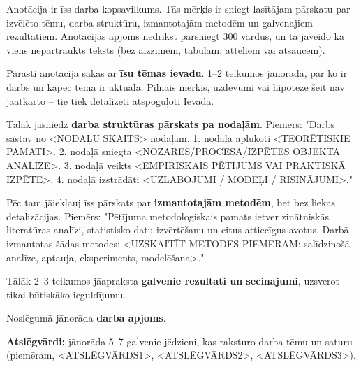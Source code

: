 \frontmatterpage
{}

Anotācija ir īss darba kopsavilkums. Tās mērķis ir sniegt lasītājam pārskatu par izvēlēto tēmu, darba struktūru, izmantotajām metodēm un galvenajiem rezultātiem. Anotācijas apjoms nedrīkst pārsniegt 300 vārdus, un tā jāveido kā viens nepārtraukts teksts (bez aizzīmēm, tabulām, attēliem vai atsaucēm).  

Parasti anotācija sākas ar \textbf{īsu tēmas ievadu}. 1–2 teikumos jānorāda, par ko ir darbs un kāpēc tēma ir aktuāla. Pilnais mērķis, uzdevumi vai hipotēze šeit nav jāatkārto – tie tiek detalizēti atspoguļoti Ievadā.  

Tālāk jāsniedz \textbf{darba struktūras pārskats pa nodaļām}.  
Piemērs:  
"Darbs sastāv no <NODAĻU SKAITS> nodaļām. 1. nodaļā aplūkoti <TEORĒTISKIE PAMATI>. 2. nodaļā sniegta <NOZARES/PROCESA/IZPĒTES OBJEKTA ANALĪZE>. 3. nodaļā veikts <EMPĪRISKAIS PĒTĪJUMS VAI PRAKTISKĀ IZPĒTE>. 4. nodaļā izstrādāti <UZLABOJUMI / MODEĻI / RISINĀJUMI>."  

Pēc tam jāiekļauj īss pārskats par \textbf{izmantotajām metodēm}, bet bez liekas detalizācijas.  
Piemērs:  
"Pētījuma metodoloģiskais pamats ietver zinātniskās literatūras analīzi, statistisko datu izvērtēšanu un citus attiecīgus avotus. Darbā izmantotas šādas metodes: <UZSKAITĪT METODES PIEMĒRAM: salīdzinošā analīze, aptauja, eksperiments, modelēšana>."  

Tālāk 2–3 teikumos jāapraksta \textbf{galvenie rezultāti un secinājumi}, uzsverot tikai būtiskāko ieguldījumu.  

Noslēgumā jānorāda \textbf{darba apjoms}.  
\thesisscopeLV

\textbf{Atslēgvārdi:} jānorāda 5–7 galvenie jēdzieni, kas raksturo darba tēmu un saturu (piemēram, <ATSLĒGVĀRDS1>, <ATSLĒGVĀRDS2>, <ATSLĒGVĀRDS3>).
